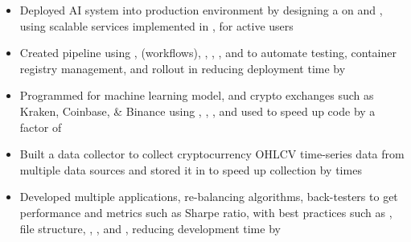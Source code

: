 {\begin{rSection}{}
 \href{https://www.wealthagile.com/}{} \hfill {}
\begin{itemize}
    \itemsep -4pt {} 
    \item Deployed AI system into production environment by designing a  on  and , using scalable services implemented in , for  active users
    \item Created  pipeline using ,  (workflows), , , , and  to automate testing, container registry management, and rollout in  reducing deployment time by 
        \item Programmed  for  machine learning model, and crypto exchanges such as Kraken, Coinbase, \& Binance using , , , and used  to speed up code by a factor of 
    \item Built a  data collector to collect cryptocurrency OHLCV time-series data from multiple data sources and stored it in  to speed up collection by  times
    \item Developed multiple  applications, re-balancing algorithms, back-testers to get performance and metrics such as Sharpe ratio, with best practices such as , file structure, , , and , reducing development time by 
\end{itemize}


\end{rSection}}
